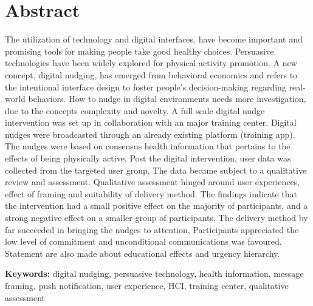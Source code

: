 \chapter*{Abstract}
The utilization of technology and digital interfaces, have become important and promising tools for making people take good healthy choices. Persuasive technologies have been widely explored for physical activity promotion. A new concept, digital nudging, has emerged from behavioral economics and refers to the intentional interface design to foster people's decision-making regarding real-world behaviors. How to nudge in digital environments needs more investigation, due to the concepts complexity and novelty. A full scale digital nudge intervention was set up in collaboration with an major training center. Digital nudges were broadcasted through an already existing platform (training app). The nudges were based on consensus health information that pertains to the effects of being physically active. Post the digital intervention, user data was collected from the targeted user group. The data became subject to a qualitative review and assessment. %
Qualitative assessment hinged around user experiences, effect of framing and suitability of delivery method. The findings indicate that the intervention had a small positive effect on the majority of participants, and a strong negative effect on a smaller group of participants. The delivery method by far succeeded in bringing the nudges to attention, Participants appreciated the low level of commitment and unconditional communications was favoured. Statement are also made about educational effects and urgency hierarchy. 

\bigbreak
\bigbreak
\textbf{Keywords:} digital nudging, persuasive technology, health information, message framing, push notification, user experience, HCI, training center, qualitative assessment